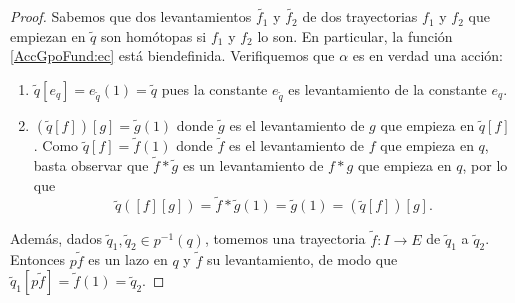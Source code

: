 \begin{proof}
 Sabemos que dos levantamientos $\widetilde{f_1}$ y $\widetilde{f_2}$ de dos trayectorias $f_1$ y $f_2$ que empiezan en $\widetilde{q}$ son
 hom\'otopas si $f_1$ y $f_2$ lo son. En particular, la funci\'on \eqref{AccGpoFund:ec} est\'a biendefinida. Verifiquemos que $\alpha$ es
 en verdad una acci\'on:
 \begin{enumerate}
  \item $\widetilde{q}[e_q] = e_{\widetilde{q}}(1) = \widetilde{q}$ pues la constante $e_{\widetilde{q}}$ es levantamiento de la constante $e_q$.
  \item $(\widetilde{q}[f])[g] = \widetilde{g}(1)$ donde $\widetilde{g}$ es el levantamiento de $g$ que empieza en $\widetilde{q}[f]$.
        Como $\widetilde{q}[f] = \widetilde{f}(1)$ donde $\widetilde{f}$ es el levantamiento de $f$ que empieza en $q$, basta observar que
        $\widetilde{f}*\widetilde{g}$ es un levantamiento de $f*g$ que empieza en $q$, por lo que
        \[ \widetilde{q}([f][g]) = \widetilde{f}*\widetilde{g}(1) = \widetilde{g}(1) = (\widetilde{q}[f])[g].   \]
 \end{enumerate}
 Adem\'as, dados $\widetilde{q}_1, \widetilde{q}_2 \in p^{-1}(q)$, tomemos una trayectoria $\widetilde{f}:I \to E$ de $\widetilde{q}_1$ a
 $\widetilde{q}_2$. Entonces $p\widetilde{f}$ es un lazo en $q$ y $\widetilde{f}$ su levantamiento, de modo que
 $\widetilde{q}_1[p\widetilde{f}] = \widetilde{f}(1) = \widetilde{q}_2$.
\end{proof}
